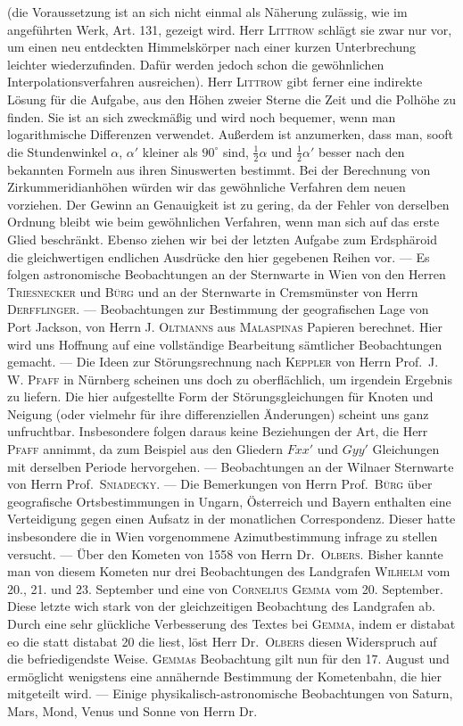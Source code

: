 (die Voraussetzung ist an sich nicht einmal als Näherung zulässig, wie im angeführten Werk, Art. 131, gezeigt wird. Herr \textsc{Littrow} schlägt sie zwar nur vor, um einen neu entdeckten Himmelskörper nach einer kurzen Unterbrechung leichter wiederzufinden. Dafür werden jedoch schon die gewöhnlichen Interpolationsverfahren ausreichen). Herr \textsc{Littrow} gibt ferner eine indirekte Lösung für die Aufgabe, aus den Höhen zweier Sterne die Zeit und die Polhöhe zu finden. Sie ist an sich zweckmäßig und wird noch bequemer, wenn man logarithmische Differenzen verwendet. Außerdem ist anzumerken, dass man, sooft die Stundenwinkel $\alpha$, $\alpha'$ kleiner als $90^{\circ}$ sind, $\frac{1}{2}\alpha$ und $\frac{1}{2}\alpha'$ besser nach den bekannten Formeln aus ihren Sinuswerten bestimmt. Bei der Berechnung von Zirkummeridianhöhen würden wir das gewöhnliche Verfahren dem neuen vorziehen. Der Gewinn an Genauigkeit ist zu gering, da der Fehler von derselben Ordnung bleibt wie beim gewöhnlichen Verfahren, wenn man sich auf das erste Glied beschränkt. Ebenso ziehen wir bei der letzten Aufgabe zum Erdsphäroid die gleichwertigen endlichen Ausdrücke den hier gegebenen Reihen vor. --- Es folgen astronomische Beobachtungen an der Sternwarte in Wien von den Herren \textsc{Triesnecker} und \textsc{Bürg} und an der Sternwarte in Cremsmünster von Herrn \textsc{Derfflinger}. --- Beobachtungen zur Bestimmung der geografischen Lage von Port Jackson, von Herrn J. \textsc{Oltmanns} aus \textsc{Malaspinas} Papieren berechnet. Hier wird uns Hoffnung auf eine vollständige Bearbeitung sämtlicher Beobachtungen gemacht. --- Die Ideen zur Störungsrechnung nach \textsc{Keppler} von Herrn Prof.\ J. W. \textsc{Pfaff} in Nürnberg scheinen uns doch zu oberflächlich, um irgendein Ergebnis zu liefern. Die hier aufgestellte Form der Störungsgleichungen für Knoten und Neigung (oder vielmehr für ihre differenziellen Änderungen) scheint uns ganz unfruchtbar. Insbesondere folgen daraus keine Beziehungen der Art, die Herr \textsc{Pfaff} annimmt, da zum Beispiel aus den Gliedern $Fxx'$ und $Gyy'$ Gleichungen mit derselben Periode hervorgehen. --- Beobachtungen an der Wilnaer Sternwarte von Herrn Prof.\ \textsc{Sniadecky}. --- Die Bemerkungen von Herrn Prof.\ \textsc{Bürg} über geografische Ortsbestimmungen in Ungarn, Österreich und Bayern enthalten eine Verteidigung gegen einen Aufsatz in der monatlichen Correspondenz. Dieser hatte insbesondere die in Wien vorgenommene Azimutbestimmung infrage zu stellen versucht. --- Über den Kometen von 1558 von Herrn Dr.\ \textsc{Olbers}. Bisher kannte man von diesem Kometen nur drei Beobachtungen des Landgrafen \textsc{Wilhelm} vom 20., 21. und 23. September und eine von \textsc{Cornelius Gemma} vom 20. September. Diese letzte wich stark von der gleichzeitigen Beobachtung des Landgrafen ab. Durch eine sehr glückliche Verbesserung des Textes bei \textsc{Gemma}, indem er distabat eo die statt distabat 20 die liest, löst Herr Dr.\ \textsc{Olbers} diesen Widerspruch auf die befriedigendste Weise. \textsc{Gemma}s Beobachtung gilt nun für den 17. August und ermöglicht wenigstens eine annähernde Bestimmung der Kometenbahn, die hier mitgeteilt wird. --- Einige physikalisch-astronomische Beobachtungen von Saturn, Mars, Mond, Venus und Sonne von Herrn Dr.\ 